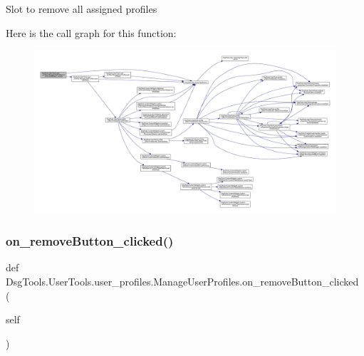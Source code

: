 \begin{DoxyVerb}Slot to remove all assigned profiles
\end{DoxyVerb}
 Here is the call graph for this function\+:
\nopagebreak
\begin{figure}[H]
\begin{center}
\leavevmode
\includegraphics[width=350pt]{class_dsg_tools_1_1_user_tools_1_1user__profiles_1_1_manage_user_profiles_a185f560c9984dd8d81c1ace1625b1979_cgraph}
\end{center}
\end{figure}
\mbox{\label{class_dsg_tools_1_1_user_tools_1_1user__profiles_1_1_manage_user_profiles_abb1da9322b288055c8d5291856536123}} 
\subsubsection{\texorpdfstring{on\+\_\+remove\+Button\+\_\+clicked()}{on\_removeButton\_clicked()}}
{\footnotesize\ttfamily def Dsg\+Tools.\+User\+Tools.\+user\+\_\+profiles.\+Manage\+User\+Profiles.\+on\+\_\+remove\+Button\+\_\+clicked (\begin{DoxyParamCaption}\item[{}]{self }\end{DoxyParamCaption})}

